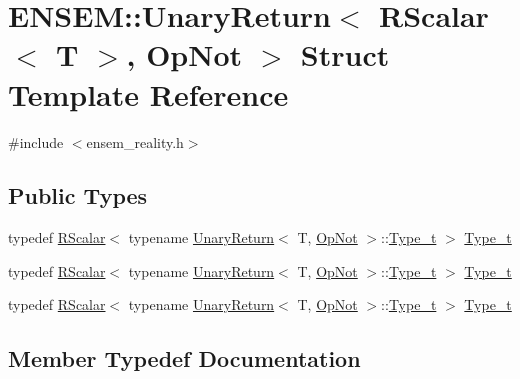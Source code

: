 \hypertarget{structENSEM_1_1UnaryReturn_3_01RScalar_3_01T_01_4_00_01OpNot_01_4}{}\section{E\+N\+S\+EM\+:\+:Unary\+Return$<$ R\+Scalar$<$ T $>$, Op\+Not $>$ Struct Template Reference}
\label{structENSEM_1_1UnaryReturn_3_01RScalar_3_01T_01_4_00_01OpNot_01_4}


{\ttfamily \#include $<$ensem\+\_\+reality.\+h$>$}

\subsection*{Public Types}
\begin{DoxyCompactItemize}
\item 
typedef \mbox{\hyperlink{classENSEM_1_1RScalar}{R\+Scalar}}$<$ typename \mbox{\hyperlink{structENSEM_1_1UnaryReturn}{Unary\+Return}}$<$ T, \mbox{\hyperlink{structENSEM_1_1OpNot}{Op\+Not}} $>$\+::\mbox{\hyperlink{structENSEM_1_1UnaryReturn_3_01RScalar_3_01T_01_4_00_01OpNot_01_4_af9f59bfbcb4e45c668599e7707d39a0c}{Type\+\_\+t}} $>$ \mbox{\hyperlink{structENSEM_1_1UnaryReturn_3_01RScalar_3_01T_01_4_00_01OpNot_01_4_af9f59bfbcb4e45c668599e7707d39a0c}{Type\+\_\+t}}
\item 
typedef \mbox{\hyperlink{classENSEM_1_1RScalar}{R\+Scalar}}$<$ typename \mbox{\hyperlink{structENSEM_1_1UnaryReturn}{Unary\+Return}}$<$ T, \mbox{\hyperlink{structENSEM_1_1OpNot}{Op\+Not}} $>$\+::\mbox{\hyperlink{structENSEM_1_1UnaryReturn_3_01RScalar_3_01T_01_4_00_01OpNot_01_4_af9f59bfbcb4e45c668599e7707d39a0c}{Type\+\_\+t}} $>$ \mbox{\hyperlink{structENSEM_1_1UnaryReturn_3_01RScalar_3_01T_01_4_00_01OpNot_01_4_af9f59bfbcb4e45c668599e7707d39a0c}{Type\+\_\+t}}
\item 
typedef \mbox{\hyperlink{classENSEM_1_1RScalar}{R\+Scalar}}$<$ typename \mbox{\hyperlink{structENSEM_1_1UnaryReturn}{Unary\+Return}}$<$ T, \mbox{\hyperlink{structENSEM_1_1OpNot}{Op\+Not}} $>$\+::\mbox{\hyperlink{structENSEM_1_1UnaryReturn_3_01RScalar_3_01T_01_4_00_01OpNot_01_4_af9f59bfbcb4e45c668599e7707d39a0c}{Type\+\_\+t}} $>$ \mbox{\hyperlink{structENSEM_1_1UnaryReturn_3_01RScalar_3_01T_01_4_00_01OpNot_01_4_af9f59bfbcb4e45c668599e7707d39a0c}{Type\+\_\+t}}
\end{DoxyCompactItemize}


\subsection{Member Typedef Documentation}
\mbox{\label{structENSEM_1_1UnaryReturn_3_01RScalar_3_01T_01_4_00_01OpNot_01_4_af9f59bfbcb4e45c668599e7707d39a0c}} 
